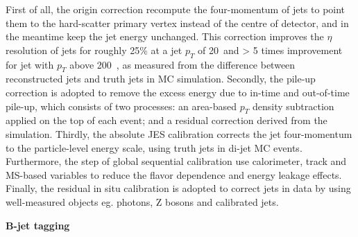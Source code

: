 First of all, the origin correction recompute the four-momentum of jets to point them to the hard-scatter primary vertex instead of the centre of detector, and in the meantime keep the jet energy unchanged.
This correction improves the $\eta$ resolution of jets for roughly 25\% at a jet $p_{T}$ of 20~\gev and > 5 times improvement for jet with $p_{T}$ above 200~\gev, 
as measured from the difference between reconstructed jets and truth jets in MC simulation.
Secondly, the pile-up correction is adopted to remove the excess energy due to in-time and out-of-time pile-up,
which consists of two processes: an area-based $p_{T}$ density subtraction applied on the top of each event; and a residual correction derived from the simulation.
Thirdly, the absolute JES calibration corrects the jet four-momentum to the particle-level energy scale, using truth jets in di-jet MC events.
Furthermore, the step of global sequential calibration use calorimeter, track and MS-based variables to reduce the flavor dependence and energy leakage effects.
Finally, the residual in situ calibration is adopted to correct jets in data by using well-measured objects eg. photons, Z bosons and calibrated jets.

\textbf{B-jet tagging}


